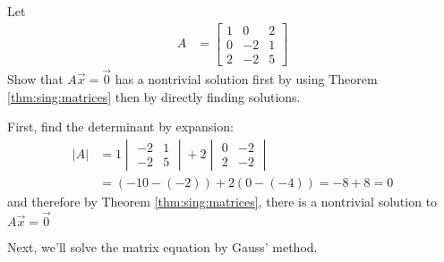 \begin{example}
Let
%
\begin{align*}
A & = \begin{bmatrix}
1 & 0 & 2 \\
0 & -2 & 1 \\
2 & -2 & 5
\end{bmatrix}
\end{align*}
Show that $A\vec{x} = \vec{0}$ has a nontrivial solution first by using Theorem \ref{thm:sing:matrices} then by directly finding solutions.

\solution

First, find the determinant by expansion:
%
\begin{align*}
|A| & = 1 \begin{vmatrix}
-2 & 1 \\ -2 & 5
\end{vmatrix} + 2 \begin{vmatrix}
0 & -2 \\ 2 & -2
\end{vmatrix} \\
& = (-10-(-2)) + 2 (0-(-4)) = -8 + 8 = 0
\end{align*}
and therefore by Theorem \ref{thm:sing:matrices}, there is a nontrivial solution to $A \vec{x} = \vec{0}$

Next, we'll solve the matrix equation by Gauss' method.


\end{example}
